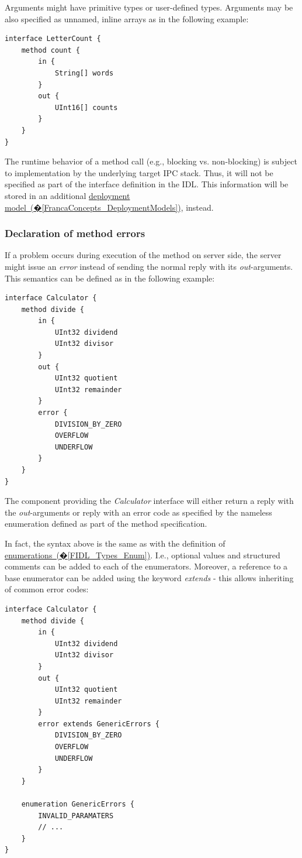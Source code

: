 \documentclass[a4paper,10pt]{scrreprt}
\begin{document}
Arguments might have primitive types or user-defined types. Arguments may be also 
specified as unnamed, inline arrays as in the following example:


\begin{lstlisting}[language=Franca]
interface LetterCount {
	method count {
		in {
			String[] words
		}
		out {
			UInt16[] counts
		}	
	}
}
\end{lstlisting}

The runtime behavior of a method call (e.g., blocking vs. non-blocking) is subject to
implementation by the underlying target IPC stack. Thus, it will not be specified as part
of the interface definition in the IDL. This information will be stored in an additional
\hyperref[FrancaConcepts_DeploymentModels]{deployment model~(�\ref*{FrancaConcepts_DeploymentModels})}, instead. 

\subsubsection{Declaration of method errors}
\label{FIDL_Interface_Method_Errors}
If a problem occurs during execution of the method on server side, the server
might issue an \textit{error} instead of sending the normal reply with its \textit{out}-arguments.
This semantics can be defined as in the following example:


\begin{lstlisting}[language=Franca]
interface Calculator {
	method divide {
		in {
			UInt32 dividend
			UInt32 divisor
		}
		out {
			UInt32 quotient
			UInt32 remainder
		}
		error {
			DIVISION_BY_ZERO
			OVERFLOW
			UNDERFLOW
		}
	}
}
\end{lstlisting}

The component providing the \textit{Calculator} interface will either return a reply
with the \textit{out}-arguments or reply with an error code as specified by the 
nameless enumeration defined as part of the method specification.

In fact, the syntax above is the same as with the definition of
\hyperref[FIDL_Types_Enum]{enumerations~(�\ref*{FIDL_Types_Enum})}. I.e., optional values and structured comments
can be added to each of the enumerators. Moreover, a reference to a base enumerator
can be added using the keyword \textit{extends} - this allows inheriting of common
error codes:  


\begin{lstlisting}[language=Franca]
interface Calculator {
	method divide {
		in {
			UInt32 dividend
			UInt32 divisor
		}
		out {
			UInt32 quotient
			UInt32 remainder
		}
		error extends GenericErrors {
			DIVISION_BY_ZERO
			OVERFLOW
			UNDERFLOW
		}			
	}

	enumeration GenericErrors {
		INVALID_PARAMATERS
		// ...
	}
}
\end{lstlisting}
\end{document}
